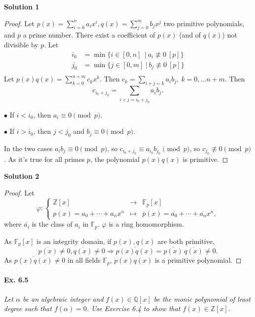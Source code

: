 \documentclass[11pt,a4paper]{article}
\newcommand{\Q}{\mathbb{Q}}
\newcommand{\Z}{\mathbb{Z}}
\newcommand{\F}{\mathbb{F}}
\begin{document}
{\bf Solution 1}
\begin{proof}
Let $p(x) =\sum_{i=0}^n a_i x^i, q(x) = \sum_{j=0}^m b_j x^j$ two primitive polynomials, and $p$ a prime number. There exist a coefficient of $p(x)$ (and of $q(x)$) not divisible by $p$.
Let 
\begin{align*}
i_0 &= \min\{i \in [0,n]\ \  \vert \ a_i \not \equiv 0 \ [p]\}\\
j_0 &= \min\{j \in [0,m]\ \vert\  b_j \not \equiv 0 \ [p]\}\\
\end{align*}
Let $p(x) q(x) = \sum_{k=0}^{n+m} c_k x^k$. Then $c_k = \sum\limits_{i+j = k} a_i b_{j}, \ k=0,\ldots n+m$.
Then $$c_{i_0+j_0} = \sum_{i+j = i_0+j_0} a_i b_j.$$

$\bullet$ If $i<i_0$, then $a_i \equiv 0 \pmod p$.

$\bullet$ If $i>i_0$, then $j<j_0$ and $b_j \equiv 0 \pmod p$.

In the two cases $a_i b_j \equiv 0 \pmod p$, so $c_{i_0+j_0} \equiv a_{i_0} b_{j_0} \pmod p$, so $c_{j_0} \not \equiv 0 \pmod p$. As it's true for all primes $p$, the polynomial $p(x)q(x)$ is primitive.
\end{proof}

\bigskip

{\bf Solution 2}
\begin{proof}
Let
$$
\varphi : 
\left\{
\begin{array}{ccc}
  \Z[x]&   \to & \F_p[x]  \\
  p(x)= a_0 +\cdots+a_n x^n& \mapsto  & \overline{p}(x) =  \overline{a_0}+\cdots+\overline{a_n}x^n,
\end{array}
\right.
$$
where $\overline{a_i}$ is the class of $a_i$ in $\F_p$.  $\varphi$ is a ring homomorphism.

As $\F_p[x]$ is an integrity domain, if $p(x), q(x)$ are both primitive,
$$\overline{p(x)} \ne 0, \overline{q(x)} \ne 0 \Rightarrow \overline{p(x)q(x)} =\overline{p(x)}\,   \overline{q(x)}  \ne 0.$$
As $\overline{p(x)q(x)} \ne 0$ in all fields $\F_p$, $p(x)q(x)$ is a primitive polynomial.
\end{proof}

\paragraph{Ex. 6.5}
{\it Let $\alpha$ be an algebraic integer and $f(x) \in \Q[x]$ be the monic polynomial of least degree such that $f(\alpha) = 0$. Use Exercise 6.4 to show that $f(x) \in \Z[x]$.
}
\end{document}
